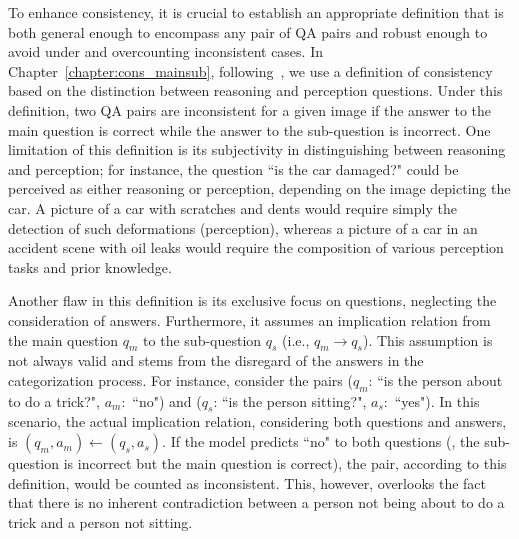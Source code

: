 To enhance consistency, it is crucial to establish an appropriate definition that is both general enough to encompass any pair of QA pairs and robust enough to avoid under and overcounting inconsistent cases. In Chapter~\ref{chapter:cons_mainsub}, following~\cite{selvaraju2020squinting}, we use a definition of consistency based on the distinction between reasoning and perception questions. Under this definition, two QA pairs are inconsistent for a given image if the answer to the main question is correct while the answer to the sub-question is incorrect. One limitation of this definition is its subjectivity in distinguishing between reasoning and perception; for instance, the question ``is the car damaged?" could be perceived as either reasoning or perception, depending on the image depicting the car. A picture of a car with scratches and dents would require simply the detection of such deformations (perception), whereas a picture of a car in an accident scene with oil leaks would require the composition of various perception tasks and prior knowledge.

Another flaw in this definition is its exclusive focus on questions, neglecting the consideration of answers. Furthermore, it assumes an implication relation from the main question $q_m$ to the sub-question $q_s$ (i.e., $q_m \rightarrow q_s$). This assumption is not always valid and stems from the disregard of the answers in the categorization process. For instance, consider the pairs ($q_m: \,$``is the person about to do a trick?", $a_m:$ ``no") and ($q_s: \,$``is the person sitting?", $a_s:$ ``yes"). In this scenario, the actual implication relation, considering both questions and answers, is $(q_m, a_m) \leftarrow (q_s, a_s)$. If the model predicts ``no" to both questions (\ie, the sub-question is incorrect but the main question is correct), the pair, according to this definition, would be counted as inconsistent. This, however, overlooks the fact that there is no inherent contradiction between a person not being about to do a trick and a person not sitting.

